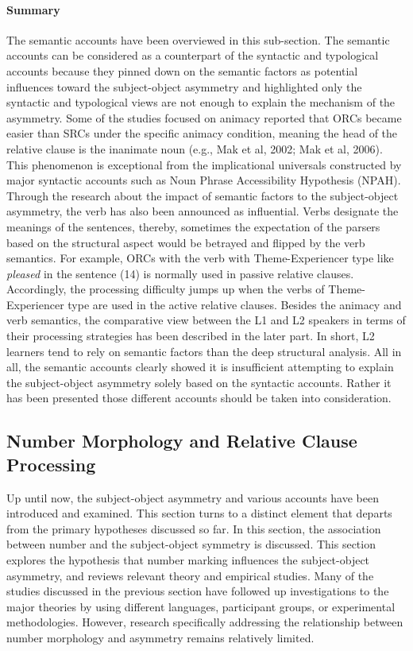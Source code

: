 \documentclass[
]{article}
\begin{document}
\paragraph{Summary}\label{summary-3}

The semantic accounts have been overviewed in this sub-section. The
semantic accounts can be considered as a counterpart of the syntactic
and typological accounts because they pinned down on the semantic
factors as potential influences toward the subject-object asymmetry and
highlighted only the syntactic and typological views are not enough to
explain the mechanism of the asymmetry. Some of the studies focused on
animacy reported that ORCs became easier than SRCs under the specific
animacy condition, meaning the head of the relative clause is the
inanimate noun (e.g., Mak et al, 2002; Mak et al, 2006). This phenomenon
is exceptional from the implicational universals constructed by major
syntactic accounts such as Noun Phrase Accessibility Hypothesis (NPAH).
Through the research about the impact of semantic factors to the
subject-object asymmetry, the verb has also been announced as
influential. Verbs designate the meanings of the sentences, thereby,
sometimes the expectation of the parsers based on the structural aspect
would be betrayed and flipped by the verb semantics. For example, ORCs
with the verb with Theme-Experiencer type like \emph{pleased} in the
sentence (14) is normally used in passive relative clauses. Accordingly,
the processing difficulty jumps up when the verbs of Theme-Experiencer
type are used in the active relative clauses. Besides the animacy and
verb semantics, the comparative view between the L1 and L2 speakers in
terms of their processing strategies has been described in the later
part. In short, L2 learners tend to rely on semantic factors than the
deep structural analysis. All in all, the semantic accounts clearly
showed it is insufficient attempting to explain the subject-object
asymmetry solely based on the syntactic accounts. Rather it has been
presented those different accounts should be taken into consideration.

\subsection{Number Morphology and Relative Clause
Processing}\label{number-morphology-and-relative-clause-processing}

\setlength{\parindent}{1.27cm}

Up until now, the subject-object asymmetry and various accounts have
been introduced and examined. This section turns to a distinct element
that departs from the primary hypotheses discussed so far. In this
section, the association between number and the subject-object symmetry
is discussed. This section explores the hypothesis that number marking
influences the subject-object asymmetry, and reviews relevant theory and
empirical studies. Many of the studies discussed in the previous section
have followed up investigations to the major theories by using different
languages, participant groups, or experimental methodologies. However,
research specifically addressing the relationship between number
morphology and asymmetry remains relatively limited.
\end{document}
